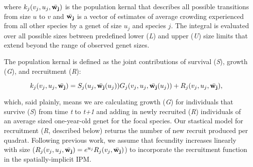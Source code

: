 \documentclass[12pt,]{article}
\begin{document}
where \(k_{j}(v_{j},u_{j},\bar{\bold{w_{j}}})\) is the population kernal
that describes all possible transitions from size \(u\) to \(v\) and
\(\bar{\bold{w_{j}}}\) is a vector of estimates of average crowding
experienced from all other species by a genet of size \(u_j\) and
species \(j\). The integral is evaluated over all possible sizes between
predefined lower (\emph{L}) and upper (\emph{U}) size limits that extend
beyond the range of observed genet sizes.

The population kernal is defined as the joint contributions of survival
(\emph{S}), growth (\emph{G}), and recruitment (\emph{R}):

\[
k_{j}(v_{j},u_{j},\bar{\bold{w_{j}}}) = S_j(u_j, \bar{\bold{w_{j}}}(u_{j}))G_j(v_{j},u_{j},\bar{\bold{w_{j}}}(u_{j})) + R_j(v_{j},u_{j},\bar{\bold{w_{j}}}),
\]

which, said plainly, means we are calculating growth (\emph{G}) for
individuals that survive (\emph{S}) from time \emph{t} to \emph{t+1} and
adding in newly recruited (\emph{R}) individuals of an average sized
one-year-old genet for the focal species. Our stastical model for
recruitment (\emph{R}, described below) returns the number of new
recruit produced per quadrat. Following previous work, we assume that
fecundity increases linearly with size
(\(R_j(v_{j},u_{j},\bar{\bold{w_{j}}}) = e^{u_j}R_j(v_{j},\bar{\bold{w_{j}}})\))
to incorporate the recruitment function in the spatially-implicit IPM.
\end{document}
